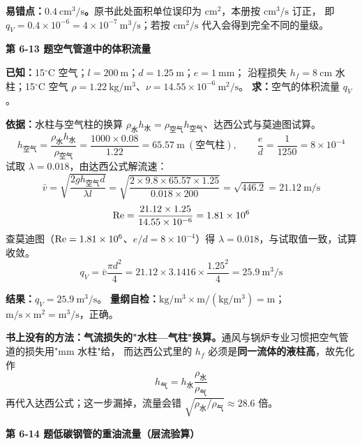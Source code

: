 \begin{yicuo}
\textbf{易错点：$0.4\ \mathrm{cm^3/s}$。}原书此处面积单位误印为 $\mathrm{cm^2}$，本册按 $\mathrm{cm^3/s}$ 订正，
即 $q_V=0.4\times10^{-6}=4\times10^{-7}\ \mathrm{m^3/s}$；若按 $\mathrm{cm^2/s}$ 代入会得到完全不同的量级。
\end{yicuo}

\noindent\textbf{第 6-13 题\quad 空气管道中的体积流量}

\begin{jie}
\textbf{已知：}15$^\circ$C 空气；$l=200\ \mathrm{m}$；$d=1.25\ \mathrm{m}$；$e=1\ \mathrm{mm}$；
沿程损失 $h_f=8\ \mathrm{cm}$ 水柱；15$^\circ$C 空气 $\rho=1.22\ \mathrm{kg/m^3}$、$\nu=14.55\times10^{-6}\ \mathrm{m^2/s}$。
\textbf{求：}空气的体积流量 $q_V$。

\textbf{依据：}水柱与空气柱的换算 $\rho_{\text{水}}h_{\text{水}}=\rho_{\text{空气}}h_{\text{空气}}$、达西公式与莫迪图试算。
\[ h_{\text{空气}}=\frac{\rho_{\text{水}}h_{\text{水}}}{\rho_{\text{空气}}}=\frac{1000\times0.08}{1.22}=65.57\ \mathrm{m}\ (\text{空气柱}),\qquad
\frac ed=\frac{1}{1250}=8\times10^{-4} \]
试取 $\lambda=0.018$，由达西公式解流速：
\[ \bar v=\sqrt{\frac{2g h_{\text{空气}}d}{\lambda l}}=\sqrt{\frac{2\times9.8\times65.57\times1.25}{0.018\times200}}
=\sqrt{446.2}=21.12\ \mathrm{m/s} \]
\[ \mathrm{Re}=\frac{21.12\times1.25}{14.55\times10^{-6}}=1.81\times10^6 \]
查莫迪图（$\mathrm{Re}=1.81\times10^6$、$e/d=8\times10^{-4}$）得 $\lambda=0.018$，与试取值一致，试算收敛。
\[ q_V=\bar v\frac{\pi d^2}{4}=21.12\times3.1416\times\frac{1.25^2}{4}=25.9\ \mathrm{m^3/s} \]

\textbf{结果：}$q_V=25.9\ \mathrm{m^3/s}$。
\textbf{量纲自检：}$\mathrm{kg/m^3\times m/(kg/m^3)}=\mathrm{m}$；$\mathrm{m/s\times m^2}=\mathrm{m^3/s}$，正确。
\end{jie}

\begin{tishi}
\textbf{书上没有的方法：气流损失的"水柱—气柱"换算。}通风与锅炉专业习惯把空气管道的损失用"$\mathrm{mm}$ 水柱"给，
而达西公式里的 $h_f$ 必须是\textbf{同一流体的液柱高}，故先化作
\[ h_{\text{气}}=h_{\text{水}}\frac{\rho_{\text{水}}}{\rho_{\text{气}}} \]
再代入达西公式；这一步漏掉，流量会错 $\sqrt{\rho_{\text{水}}/\rho_{\text{气}}}\approx28.6$ 倍。
\end{tishi}

\noindent\textbf{第 6-14 题\quad 低碳钢管的重油流量（层流验算）}

